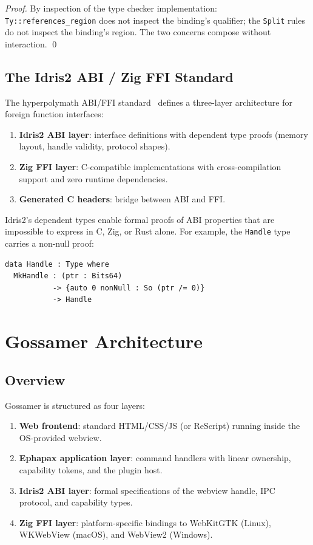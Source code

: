 \documentclass[11pt,a4paper]{article}
\theoremstyle{definition}
\begin{document}
\begin{proof}
By inspection of the type checker implementation:
\texttt{Ty::references\_region} does not inspect the binding's
qualifier; the \texttt{Split} rules do not inspect the binding's
region. The two concerns compose without interaction. \qed
\end{proof}

\subsection{The Idris2 ABI / Zig FFI Standard}

The hyperpolymath ABI/FFI standard~\cite{hyperpolymath-abi} defines
a three-layer architecture for foreign function interfaces:

\begin{enumerate}[nosep]
  \item \textbf{Idris2 ABI layer}: interface definitions with dependent
    type proofs (memory layout, handle validity, protocol shapes).
  \item \textbf{Zig FFI layer}: C-compatible implementations with
    cross-compilation support and zero runtime dependencies.
  \item \textbf{Generated C headers}: bridge between ABI and FFI.
\end{enumerate}

Idris2's dependent types enable formal proofs of ABI properties that
are impossible to express in C, Zig, or Rust alone. For example, the
\texttt{Handle} type carries a non-null proof:

\begin{lstlisting}[style=idris]
data Handle : Type where
  MkHandle : (ptr : Bits64)
           -> {auto 0 nonNull : So (ptr /= 0)}
           -> Handle
\end{lstlisting}

\section{Gossamer Architecture}
\label{sec:architecture}

\subsection{Overview}

Gossamer is structured as four layers:

\begin{enumerate}[nosep]
  \item \textbf{Web frontend}: standard HTML/CSS/JS (or ReScript)
    running inside the OS-provided webview.
  \item \textbf{Ephapax application layer}: command handlers with linear
    ownership, capability tokens, and the plugin host.
  \item \textbf{Idris2 ABI layer}: formal specifications of the webview
    handle, IPC protocol, and capability types.
  \item \textbf{Zig FFI layer}: platform-specific bindings to
    WebKitGTK (Linux), WKWebView (macOS), and WebView2 (Windows).
\end{enumerate}
\end{document}
